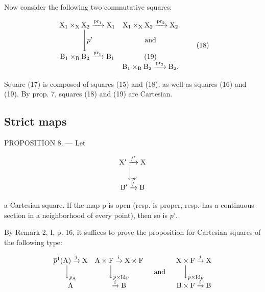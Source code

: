 Now consider the following two commutative squares:

\[
\begin{array}{c c} \mathrm{X} _ {1} \times_ {\mathrm{X}} \mathrm{X} _ {2} \xrightarrow {\operatorname{pr} _ {1}} \mathrm{X} _ {1} & \mathrm{X} _ {1} \times_ {\mathrm{X}} \mathrm{X} _ {2} \xrightarrow {\operatorname{pr} _ {2}} \mathrm{X} _ {2} \\ \Biggl \downarrow p ^ {\prime} & \text {and} \\ \mathrm{B} _ {1} \times_ {\mathrm{B}} \mathrm{B} _ {2} \xrightarrow {\operatorname{pr} _ {1}} \mathrm{B} _ {1} & \mathrm{(19)} \\ & \mathrm{B} _ {1} \times_ {\mathrm{B}} \mathrm{B} _ {2} \xrightarrow {\operatorname{pr} _ {2}} \mathrm{B} _ {2}. \end{array}\tag{18}
\]

Square (17) is composed of squares (15) and (18), as well as squares (16) and (19). By prop. 7, squares (18) and (19) are Cartesian.

\subsection{Strict maps}

PROPOSITION 8. --- Let

\[
\begin{array}{c} \mathrm {X^ {\prime}} \xrightarrow {f ^ {\prime}} \mathrm{X} \\ \Big \downarrow_ {p ^ {\prime}} \\ \mathrm {B^ {\prime}} \xrightarrow {f} \mathrm{B} \end{array}
\]

a Cartesian square. If the map p is open (resp. is proper, resp. has a continuous section in a neighborhood of every point), then so is \(p'\).

By Remark 2, I, p. 16, it suffices to prove the proposition for Cartesian squares of the following type:

\[
\begin{array}{c c} \overline {{p}} ^ {1} (\mathrm {A}) \xrightarrow {j} \mathrm{X} & \mathrm {A} \times \mathrm{F} \xrightarrow {i} \mathrm{X} \times \mathrm{F} \\ \Big \downarrow_ {p _ {\mathrm {A}}} & \Big \downarrow_ {p \times \mathrm {Id}_{\mathrm {F}}} \\ \mathrm {A} & \xrightarrow {i} \mathrm {B} \end{array} \quad\text {and} \quad \begin{array}{c} \mathrm {X} \times \mathrm {F} \xrightarrow {j} \mathrm {X} \\ \Big \downarrow_ {p \times \mathrm {Id}_{\mathrm {F}}} \\ \mathrm {B} \times \mathrm {F} \xrightarrow {i} \mathrm {B} \end{array}
\]

